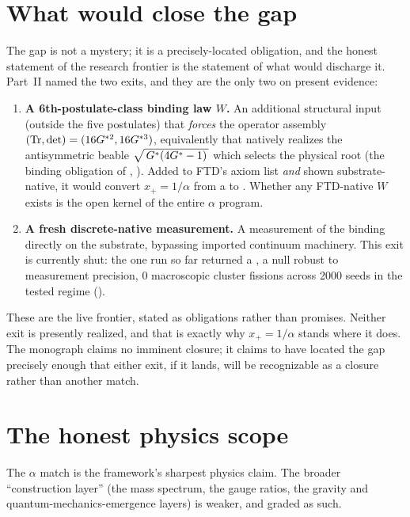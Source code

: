\section{What would close the gap}\label{sec:close}
The gap is not a mystery; it is a precisely-located obligation, and the honest
statement of the research frontier is the statement of what would discharge it.
Part~II named the two exits, and they are the only two on present evidence:
\begin{enumerate}[leftmargin=1.8em, itemsep=4pt]
  \item \textbf{A 6th-postulate-class binding law $W$.} An additional structural
        input (outside the five postulates) that \emph{forces} the
        operator assembly $(\operatorname{Tr},\operatorname{det})=(16G^{*2},16G^{*3})$, equivalently that
        natively realizes the antisymmetric beable $\sqrt{\,G^{*}(4G^{*} - 1)\,}$ which selects the
        physical root (the binding obligation of , ).
        Added to FTD's axiom list \emph{and} shown substrate-native, it would
        convert $x_+=1/\alpha$ from a  to .
        Whether any FTD-native $W$ exists is the open kernel of the entire
        $\alpha$ program.
  \item \textbf{A fresh discrete-native measurement.} A measurement of the binding
        directly on the substrate, bypassing imported continuum machinery. This
        exit is currently shut: the one run so far returned a , a
        null robust to measurement precision, 0 macroscopic cluster fissions
        across 2000 seeds in the tested regime ().
\end{enumerate}
These are the live frontier, stated as obligations rather than promises. Neither
exit is presently realized, and that is exactly why $x_+=1/\alpha$ stands where
it does. The monograph claims no imminent closure; it claims to have located the gap
precisely enough that either exit, if it lands, will be recognizable as a closure
rather than another match.

\section{The honest physics scope}\label{sec:scope}
The $\alpha$ match is the framework's sharpest physics claim. The broader
``construction layer'' (the mass spectrum, the gauge ratios, the gravity and
quantum-mechanics-emergence layers) is weaker, and graded as such.

